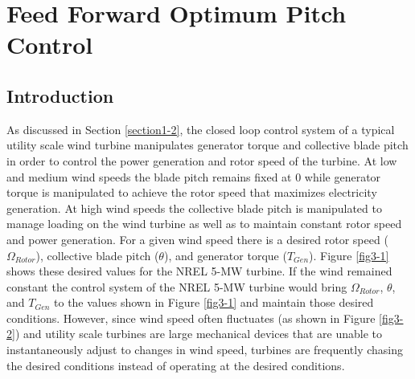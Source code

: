
\chapter{Feed Forward Optimum Pitch Control} %

\label{Chapter3} %




\section{Introduction} \label{section3-1}
As discussed in Section \ref{section1-2}, the closed loop control system of a typical utility scale wind turbine manipulates generator torque and collective blade pitch in order to control the power generation and rotor speed of the turbine. At low and medium wind speeds the blade pitch remains fixed at 0\degree{} while generator torque is manipulated to achieve the rotor speed that maximizes electricity generation. At high wind speeds the collective blade pitch is manipulated to manage loading on the wind turbine as well as to maintain constant rotor speed and power generation. For a given wind speed there is a desired rotor speed ($\Omega_{Rotor}$), collective blade pitch ($\theta$), and generator torque ($T_{Gen}$). Figure \ref{fig3-1} shows these desired values for the NREL 5-MW turbine. If the wind remained constant the control system of the NREL 5-MW turbine would bring $\Omega_{Rotor}$, $\theta$, and $T_{Gen}$ to the values shown in Figure \ref{fig3-1} and maintain those desired conditions. However, since wind speed often fluctuates (as shown in Figure \ref{fig3-2}) and utility scale turbines are large mechanical devices that are unable to instantaneously adjust to changes in wind speed, turbines are frequently chasing the desired conditions instead of operating at the desired conditions.


